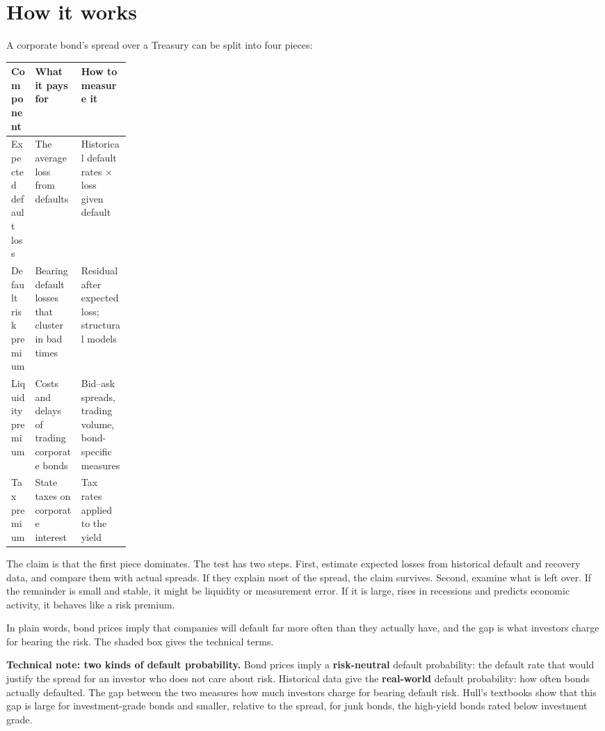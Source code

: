 \section{How it works}
\label{sec:15-how}

A corporate bond's spread over a Treasury can be split into four pieces:

\begin{center}
\small
\begin{tabularx}{0.9\linewidth}{@{}>{\raggedright\arraybackslash}p{0.2\linewidth}>{\raggedright\arraybackslash}X>{\raggedright\arraybackslash}X@{}}
\toprule
Component & What it pays for & How to measure it \\
\midrule
Expected default loss & The average loss from defaults & Historical default rates $\times$ loss given default \\
Default risk premium & Bearing default losses that cluster in bad times & Residual after expected loss; structural models \\
Liquidity premium & Costs and delays of trading corporate bonds & Bid--ask spreads, trading volume, bond-specific measures \\
Tax premium & State taxes on corporate interest & Tax rates applied to the yield \\
\bottomrule
\end{tabularx}
\end{center}

The claim is that the first piece dominates. The test has two steps. First, estimate expected losses from historical default and recovery data, and compare them with actual spreads. If they explain most of the spread, the claim survives. Second, examine what is left over. If the remainder is small and stable, it might be liquidity or measurement error. If it is large, rises in recessions and predicts economic activity, it behaves like a risk premium.

In plain words, bond prices imply that companies will default far more often than they actually have, and the gap is what investors charge for bearing the risk. The shaded box gives the technical terms.

\begin{technote}
\textbf{Technical note: two kinds of default probability.} Bond prices imply a \textbf{risk-neutral} default probability: the default rate that would justify the spread for an investor who does not care about risk. Historical data give the \textbf{real-world} default probability: how often bonds actually defaulted. The gap between the two measures how much investors charge for bearing default risk. Hull's textbooks show that this gap is large for investment-grade bonds and smaller, relative to the spread, for junk bonds, the high-yield bonds rated below investment grade.
\end{technote}

